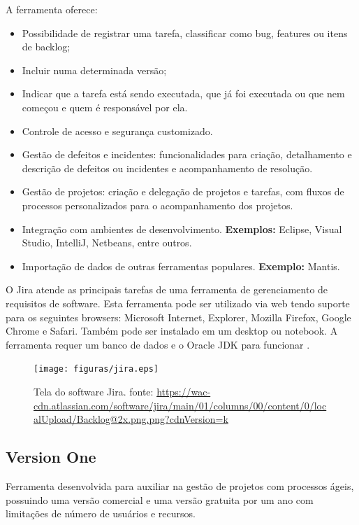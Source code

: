 A ferramenta oferece:
\begin{itemize}
    \item Possibilidade de registrar uma tarefa, classificar como bug, features ou itens de backlog;
    \item Incluir numa determinada versão;
    \item Indicar que a tarefa está sendo executada, que já foi executada ou que nem começou e quem é responsável por ela. 
    \item Controle de acesso e segurança customizado.
    \item Gestão de defeitos e incidentes: funcionalidades para criação, detalhamento e descrição de defeitos  ou incidentes e acompanhamento de resolução.
    \item Gestão de projetos: criação e delegação de projetos e tarefas, com fluxos de processos personalizados para o acompanhamento dos projetos.
    \item Integração com ambientes de desenvolvimento. \textbf{Exemplos:} Eclipse, Visual Studio, IntelliJ, Netbeans, entre outros.
    \item Importação de dados de outras ferramentas populares. \textbf{Exemplo:} Mantis.
\end{itemize} 

O Jira atende as principais tarefas de uma ferramenta de gerenciamento de requisitos de software. Esta ferramenta pode ser utilizado via web tendo suporte para os seguintes browsers: Microsoft Internet, Explorer, Mozilla Firefox, Google Chrome e Safari. Também pode ser instalado em um desktop ou notebook. A ferramenta requer um banco de dados e o Oracle JDK para funcionar \cite{jira2016}.
\begin{figure}[H]
    \centering
    \caption[Tela do software Jira]{Tela do software Jira. fonte: \url{https://wac-cdn.atlassian.com/software/jira/main/01/columns/00/content/0/localUpload/Backlog@2x.png.png?cdnVersion=k}}
    \label{jiraFerramenta}
    \texttt{[image: figuras/jira.eps]}
\end{figure}

\subsection{Version One}

Ferramenta desenvolvida para auxiliar na gestão de projetos com processos ágeis, possuindo uma versão comercial e uma versão gratuita por um ano com limitações de número de usuários e recursos.

